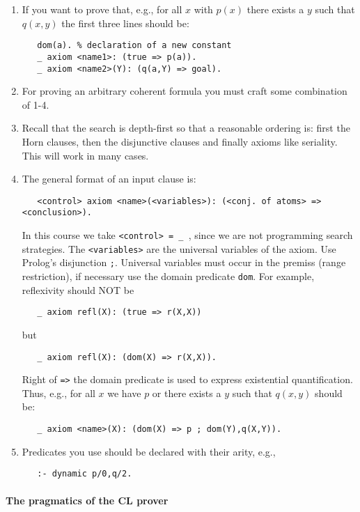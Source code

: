 \documentclass{article}
\begin{document}
\begin{enumerate}
\item If you want to prove that, e.g., for all $x$ with $p(x)$ there exists
   a $y$ such that $q(x,y)$ the first three lines should be:
\begin{verbatim}
   dom(a). % declaration of a new constant
   _ axiom <name1>: (true => p(a)).
   _ axiom <name2>(Y): (q(a,Y) => goal).
 \end{verbatim}
 \item For proving an arbitrary coherent formula you must craft some
   combination of 1-4.
 \item Recall that the search is depth-first so that a reasonable
   ordering is: first the Horn clauses, then the disjunctive clauses
   and finally axioms like seriality.  This will work in many cases.
\item The general format of an input clause is:
\begin{verbatim}
   <control> axiom <name>(<variables>): (<conj. of atoms> => <conclusion>).
\end{verbatim}
  In this course we take \texttt{<control> = \_ }, since we are not
  programming search strategies.
  The \texttt{<variables>} are the universal variables of the axiom.
  Use Prolog's disjunction \texttt{;}. Universal variables must occur
  in the premiss (range restriction), if necessary use the domain
  predicate \texttt{dom}. For example, reflexivity should NOT be
\begin{verbatim}
   _ axiom refl(X): (true => r(X,X)) 
\end{verbatim}
but 
\begin{verbatim}
   _ axiom refl(X): (dom(X) => r(X,X)). 
\end{verbatim}
Right of \texttt{=>} the domain predicate is used to express
existential quantification.  Thus, e.g., for all $x$ we have $p$ or
there exists a $y$ such that $q(x,y)$ should be:
\begin{verbatim}
   _ axiom <name>(X): (dom(X) => p ; dom(Y),q(X,Y)).
\end{verbatim}
\item Predicates you use should be declared with their arity, e.g.,
\begin{verbatim}
   :- dynamic p/0,q/2.
\end{verbatim}
\end{enumerate}


\paragraph{The pragmatics of the CL prover}
\end{document}

